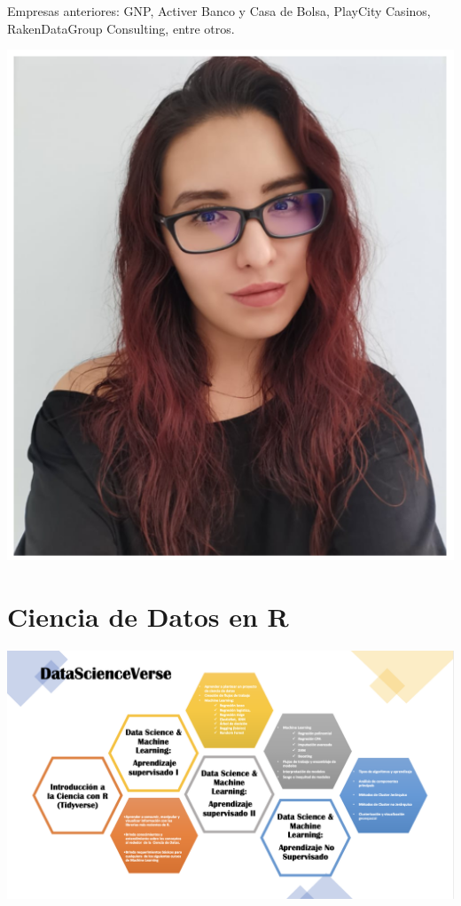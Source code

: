 \documentclass[
]{book}
\begin{document}
Empresas anteriores: GNP, Activer Banco y Casa de Bolsa, PlayCity Casinos,
RakenDataGroup Consulting, entre otros.

\begin{center}\includegraphics[width=6.54in]{img/00-presentacion/lizzy} \end{center}

\hypertarget{ciencia-de-datos-en-r}{%
\section{Ciencia de Datos en R}\label{ciencia-de-datos-en-r}}

\begin{center}\includegraphics[width=28.53in]{img/00-presentacion/DataScienceVerse} \end{center}
\end{document}
